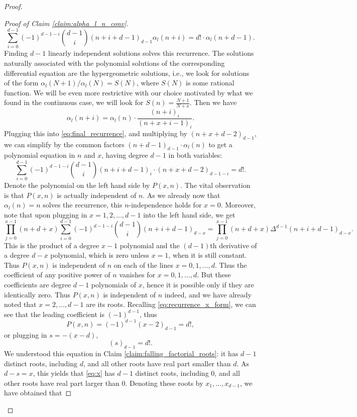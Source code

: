 \documentclass[11pt]{article}
\theoremstyle{definition}
\begin{document}
\begin{proof}
\begin{proof}[Proof of Claim \ref{claim:alpha_l_n_conv}]
\begin{equation}
    \sum_{i=0}^{d-1}(-1)^{d-1-i} \binom{d-1}{i}(n+i+d-1)_{d-1}\alpha_l(n+i)=d!\cdot\alpha_l(n+d-1).
    \end{equation}
    Finding $d-1$ linearly independent solutions solves this recurrence. The solutions naturally associated with the polynomial solutions of the corresponding differential equation are the hypergeometric solutions, i.e., we look for solutions of the form $\alpha_l(N+1)/\alpha_l(N)=S(N)$, where $S(N)$ is some rational function. We will be even more restrictive with our choice motivated by what we found in the continuous case, we will look for $S(n)=\frac{N+1}{N+x}$. 
    Then we have 
    $$\alpha_l(n+i)=\alpha_l(n)\cdot \frac{(n+i)_i}{(n+x+i-1)_i}.$$
    Plugging this into \eqref{eq:final_recurrence}, and multiplying by $(n+x+d-2)_{d-1}$, we can simplify by the common factors $(n+d-1)_{d-1}\cdot \alpha_l(n)$ to get a polynomial equation in $n$ and $x$, having degree $d-1$ in both variables:
    \begin{equation}\label{eq:recurrence_x_form}
    \sum_{i=0}^{d-1}(-1)^{d-1-i} \binom{d-1}{i}(n+i+d-1)_{i}\cdot (n+x+d-2)_{d-1-i}=d!.
    \end{equation}    
    Denote the polynomial on the left hand side by $P(x, n)$. The vital observation is that $P(x, n)$ is actually independent of $n$. As we already now that $\alpha_l(n)=n$ solves the recurrence, this $n$-independence holds for $x=0$. Moreover, note that upon plugging in $x=1,2 , \dots, d-1$ into the left hand side, we get
    $$\prod_{j=0}^{x-1}(n+d+x)\sum_{i=0}^{d-1}(-1)^{d-1-i}\binom{d-1}{i}(n+i+d-1)_{d-x}=\prod_{j=0}^{x-1}(n+d+x) \Delta^{d-1}(n+i+d-1)_{d-x}.$$
    This is the product of a degree $x-1$ polynomial and the $(d-1)$th derivative of a degree $d-x$ polynomial, which is zero unless $x=1$, when it is still constant. Thus $P(x, n)$ is independent of $n$ on each of the lines $x=0, 1, \dots, d$. Thus the coefficient of any positive power of $n$ vanishes for $x=0, 1, \dots, d$. But these coefficients are degree $d-1$ polynomials of $x$, hence it is possible only if they are identically zero. Thus $P(x, n)$ is independent of $n$ indeed, and we have already noted that $x=2, \dots, d-1$ are its roots. Recalling \eqref{eq:recurrence_x_form}, we can see that the leading coefficient is $(-1)^{d-1}$, thus 
    \begin{equation}\label{eq:x}
    P(x, n)=(-1)^{d-1}(x-2)_{d-1}=d!,
    \end{equation}
    or plugging in $s=-(x-d)$,
    $$(s)_{d-1}=d!.$$
    We understood this equation in Claim \ref{claim:falling_factorial_roots}: it has $d-1$ distinct roots, including $d$, and all other roots have real part smaller than $d$. As $d-s=x$, this yields that \eqref{eq:x} has $d-1$ distinct roots, including 0, and all other roots have real part larger than 0. Denoting these roots by $x_1, \dots, x_{d-1}$, we have obtained that

\end{proof}
\end{proof}
\end{document}
